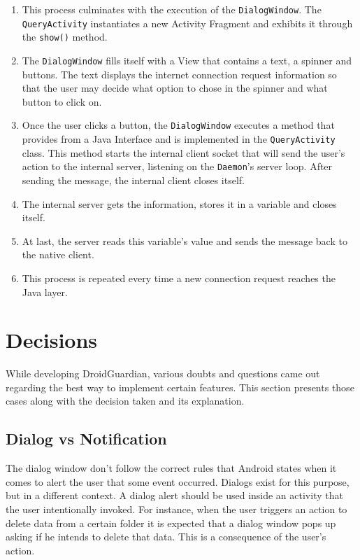 \begin{enumerate}
\item This process culminates with the execution of the \texttt{DialogWindow}. The \texttt{QueryActivity} instantiates a new Activity Fragment and exhibits it through the \texttt{show()} method.
\item The \texttt{DialogWindow} fills itself with a View that contains a text, a spinner and buttons. The text displays the internet connection request information so that the user may decide what option to chose in the spinner and what button to click on.
\item Once the user clicks a button, the \texttt{DialogWindow} executes a method that provides from a Java Interface and is implemented in the \texttt{QueryActivity} class. This method starts the internal client socket that will send the user's action to the internal server, listening on the \texttt{Daemon}'s server loop. After sending the message, the internal client closes itself.
\item The internal server gets the information, stores it in a variable and closes itself.
\item At last, the server reads this variable's value and sends the message back to the native client.
\item This process is repeated every time a new connection request reaches the Java layer.
\end{enumerate} 


\section{Decisions}

While developing DroidGuardian, various doubts and questions came out regarding the best way to implement certain features. This section presents those cases along with the decision taken and its explanation.

\subsection{Dialog vs Notification}

The dialog window don't follow the correct rules that Android states when it comes to alert the user that some event occurred. Dialogs exist for this purpose, but in a different context. A dialog alert should be used inside an activity that the user intentionally invoked. For instance, when the user triggers an action to delete data from a certain folder it is expected that a dialog window pops up asking if he intends to delete that data. This is a consequence of the user's action.

